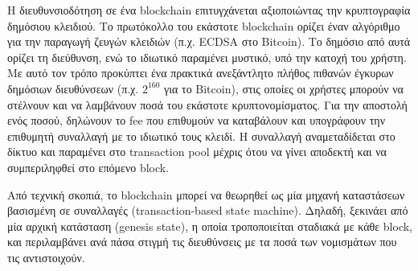 Η διευθυνσιοδότηση σε ένα blockchain επιτυγχάνεται αξιοποιώντας την κρυπτογραφία δημόσιου κλειδιού. Το πρωτόκολλο του εκάστοτε blockchain ορίζει έναν αλγόριθμο για την παραγωγή ζευγών κλειδιών (π.χ. ECDSA στο Bitcoin). Το δημόσιο από αυτά ορίζει τη διεύθυνση, ενώ το ιδιωτικό παραμένει μυστικό, υπό την κατοχή του χρήστη. Με αυτό τον τρόπο προκύπτει ένα πρακτικά ανεξάντλητο πλήθος πιθανών έγκυρων δημόσιων διευθύνσεων (π.χ. $2^{160}$ για το Bitcoin), στις οποίες οι χρήστες μπορούν να στέλνουν και να λαμβάνουν ποσά του εκάστοτε κρυπτονομίσματος. Για την αποστολή ενός ποσού, δηλώνουν το fee που επιθυμούν να καταβάλουν και υπογράφουν την επιθυμητή συναλλαγή με το ιδιωτικό τους κλειδί. Η συναλλαγή αναμεταδίδεται στο δίκτυο και παραμένει στο transaction pool μέχρις ότου να γίνει αποδεκτή και να συμπεριληφθεί στο επόμενο block.

Από τεχνική σκοπιά, το blockchain μπορεί να θεωρηθεί ως μία μηχανή καταστάσεων βασισμένη σε συναλλαγές (transaction-based state machine). Δηλαδή, ξεκινάει από μία αρχική κατάσταση (genesis state), η οποία τροποποιείται σταδιακά με κάθε block, και περιλαμβάνει ανά πάσα στιγμή τις διευθύνσεις με τα ποσά των νομισμάτων που τις αντιστοιχούν.

